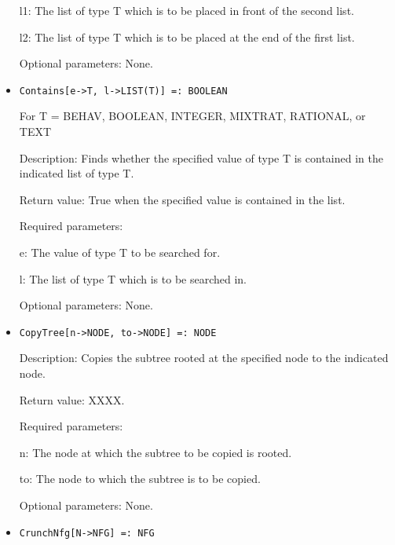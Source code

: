 \begin{itemize}
\bd
\item
[ l1:] The list of type T which is to be placed in front of the second list.
\item 
[l2:] The list of type T which is to be placed at the end of the first list.
\ed

\item
[Optional parameters:] None.
\ed

\item
\protect \large \begin{verbatim}
Contains[e->T, l->LIST(T)] =: BOOLEAN
\end{verbatim}\normalsize

For T = BEHAV, BOOLEAN, INTEGER, MIXTRAT, RATIONAL, or TEXT

\bd
\item
[Description:] Finds whether the specified value of type T is
contained in the indicated list of type T.
\item 
[Return value:] True when the specified value is contained in the list.
\item
[Required parameters:]\hfil\null
	
\bd
\item	
[ e:] The value of type T to be searched for.
\item
[ l:] The list of type T which is to be searched in.
\ed

\item
[Optional parameters:] None.
\ed

\item

\protect \large \begin{verbatim}
CopyTree[n->NODE, to->NODE] =: NODE
\end{verbatim}\normalsize

\bd
\item
[Description:] Copies the subtree rooted at the specified node to the
indicated node.
\item
[Return value:] XXXX.
\item
[Required parameters:]\hfil\null

\bd
\item	
[ n:] The node at which the subtree to be copied is rooted.
\item
[ to:] The node to which the subtree is to be copied.
\ed

\item
[Optional parameters:] None.
\ed

\item
\protect \large \begin{verbatim}
CrunchNfg[N->NFG] =: NFG
\end{verbatim}\normalsize


\end{itemize}
